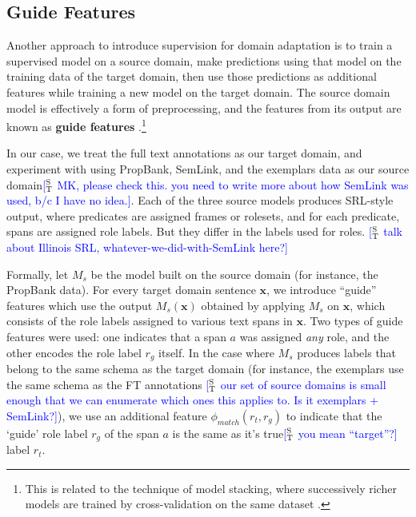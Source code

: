 \documentclass[11pt,a4paper]{article}
\newcommand{\ensuretext}[1]{#1}
\newcommand{\stmarker}{\ensuretext{\textcolor{blue}{\ensuremath{^{\textsc{S}}_{\textsc{T}}}}}}
\newcommand{\arkcomment}[3]{\ensuretext{\textcolor{#3}{[#1 #2]}}}
\newcommand{\st}[1]{\arkcomment{\stmarker}{#1}{blue}}
\newcommand{\x}{\mathbf{x}}
\begin{document}
\subsection{Guide Features}
\label{sec:guide}
Another approach to introduce supervision for domain adaptation %
is to train a supervised model on a source domain, make predictions using that model on the training data of the target domain, then use those predictions as additional features while training a new model on the target domain.
The source domain model is effectively a form of preprocessing, and the features from its output are known as \textbf{guide features} \citep{johansson-13,kong-14}.\footnote{This is related to the technique
of model stacking, where successively richer models are trained by cross-validation on the same dataset 
\citet[e.g.,][]{cohen-05,nivre-08,martins-08}.}

In our case, we treat the full text annotations as our target domain, and experiment with using PropBank, SemLink, and the exemplars data as our source domain\st{MK, please check this. you need to write more about how SemLink was used, b/c I have no idea.}.
Each of the three source models produces SRL-style output, where predicates are assigned frames or rolesets, and for each predicate, spans are assigned role labels.
But they differ in the labels used for roles.
\st{talk about Illinois SRL, whatever-we-did-with-SemLink here?}

Formally, let $M_{s}$ be the model built on
the source domain (for instance, the PropBank data). 
For every target domain sentence $\x$, we introduce ``guide'' features which use the output $M_s(\x)$
obtained by applying $M_s$ on $\x$, which consists of the role labels assigned to various text spans in $\x$.
Two types of guide features were used:
one indicates that a span $a$ was assigned \emph{any} role, and the other encodes the role label $r_g$ itself.
In the case where $M_s$ produces labels
that belong to the same schema as the target domain 
(for instance, the exemplars use the same schema as the FT annotations \st{our set of source domains is small enough that we can enumerate which ones this applies to. Is it exemplars + SemLink?}), 
we use an additional feature $\phi_{match}(r_t,r_g)$ to indicate that 
the `guide' role label $r_g$ of the span $a$ is the same as it's true\st{you mean ``target''?} label $r_t$.
\end{document}
